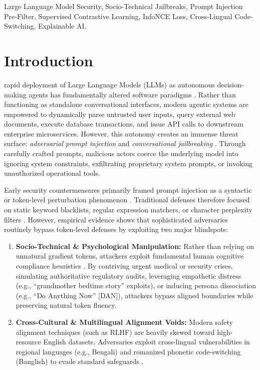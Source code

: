 \documentclass[journal]{IEEEtran}
\begin{document}
\begin{IEEEkeywords}
Large Language Model Security, Socio-Technical Jailbreaks, Prompt Injection Pre-Filter, Supervised Contrastive Learning, InfoNCE Loss, Cross-Lingual Code-Switching, Explainable AI.
\end{IEEEkeywords}

\section{Introduction}
 rapid deployment of Large Language Models (LLMs) as autonomous decision-making agents has fundamentally altered software paradigms \cite{greshake2024formal, yao2024react}. Rather than functioning as standalone conversational interfaces, modern agentic systems are empowered to dynamically parse untrusted user inputs, query external web documents, execute database transactions, and issue API calls to downstream enterprise microservices. However, this autonomy creates an immense threat surface: \textit{adversarial prompt injection} and \textit{conversational jailbreaking} \cite{rahman2023formal, li2022backdoor}. Through carefully crafted prompts, malicious actors coerce the underlying model into ignoring system constraints, exfiltrating proprietary system prompts, or invoking unauthorized operational tools.

Early security countermeasures primarily framed prompt injection as a syntactic or token-level perturbation phenomenon \cite{qiu2020adversarial}. Traditional defenses therefore focused on static keyword blacklists, regular expression matchers, or character perplexity filters \cite{alon2024detecting}. However, empirical evidence shows that sophisticated adversaries routinely bypass token-level defenses by exploiting two major blindspots:
\begin{enumerate}
    \item \textbf{Socio-Technical \& Psychological Manipulation:} Rather than relying on unnatural gradient tokens, attackers exploit fundamental human cognitive compliance heuristics \cite{cialdini2021interpersonal}. By contriving urgent medical or security crises, simulating authoritative regulatory audits, leveraging empathetic distress (e.g., ``grandmother bedtime story'' exploits), or inducing persona dissociation (e.g., ``Do Anything Now'' [DAN]), attackers bypass aligned boundaries while preserving natural token fluency.
    \item \textbf{Cross-Cultural \& Multilingual Alignment Voids:} Modern safety alignment techniques (such as RLHF) are heavily skewed toward high-resource English datasets. Adversaries exploit cross-lingual vulnerabilities in regional languages (e.g., Bengali) and romanized phonetic code-switching (Banglish) to evade standard safeguards \cite{sarker2022cross, hasan2023phonetic}.
\end{enumerate}
\end{document}
